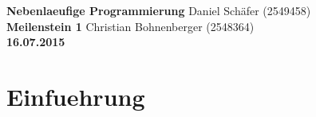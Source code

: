 \documentclass[12pt]{article}
\begin{document}

\noindent
{\Large \textbf{Nebenlaeufige Programmierung}} \hfill Daniel Schäfer (2549458) \\
{\Large \textbf{Meilenstein 1}} \hfill Christian Bohnenberger (2548364)
\\
{\textbf{16.07.2015}}
\\

\section{Einfuehrung}
\end{document}
